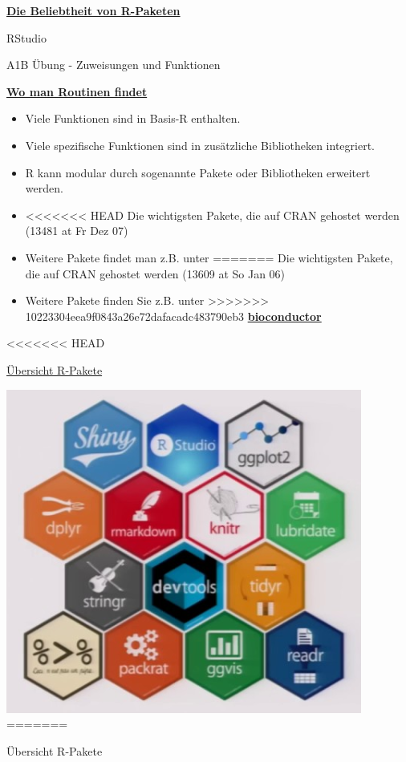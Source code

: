 \documentclass[ignorenonframetext,]{beamer}
\providecommand{\tightlist}{%
  \setlength{\itemsep}{0pt}\setlength{\parskip}{0pt}}
\begin{document}
\begin{frame}{\href{https://gallery.shinyapps.io/cran-gauge/}{\textbf{Die
Beliebtheit von R-Paketen}}}
\begin{frame}{RStudio}
\begin{frame}[fragile]{A1B Übung - Zuweisungen und Funktionen}
\begin{frame}{\href{https://stats.idre.ucla.edu/r/seminars/intro/}{\textbf{Wo
man Routinen findet}}}
\begin{itemize}
\tightlist
\item
  Viele Funktionen sind in Basis-R enthalten.
\item
  Viele spezifische Funktionen sind in zusätzliche Bibliotheken
  integriert.
\item
  R kann modular durch sogenannte Pakete oder Bibliotheken erweitert
  werden.
\item
<<<<<<< HEAD
  Die wichtigsten Pakete, die auf CRAN gehostet werden (13481 at Fr Dez
  07)
\item
  Weitere Pakete findet man z.B. unter
=======
  Die wichtigsten Pakete, die auf CRAN gehostet werden (13609 at So Jan
  06)
\item
  Weitere Pakete finden Sie z.B. unter
>>>>>>> 10223304eea9f0843a26e72dafacadc483790eb3
  \href{www.bioconductor.org}{\textbf{bioconductor}}
\end{itemize}

\end{frame}

<<<<<<< HEAD
\begin{frame}{\href{https://www.youtube.com/watch?v=kKI9--Opmso}{Übersicht
R-Pakete}}

\includegraphics{figure/packages_overview.PNG}
=======
\begin{frame}{Übersicht R-Pakete}
\protect\hypertarget{ubersicht-r-pakete}{}


\end{frame}
\end{frame}
\end{frame}
\end{frame}
\end{frame}
\end{document}
